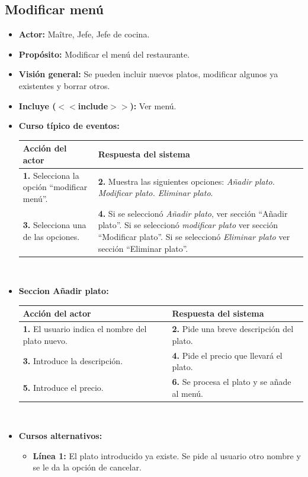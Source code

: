 \documentclass[spanish,a4paper,11pt, twoside]{report}	%
\begin{document}
		\subsection{Modificar menú}
			\begin{itemize}
			\item \textbf{Actor:} Maître, Jefe, Jefe de cocina.
			\item \textbf{Propósito:} Modificar el menú del restaurante.
			\item \textbf{Visión general:} Se pueden incluir nuevos platos, modificar algunos ya existentes y borrar otros.
			\item \textbf{Incluye ($<<$include$>>$):} Ver menú.
			\item \textbf{Curso típico de eventos:} 	\\
			\begin{tabular}{|p{6cm}||p{6cm}|}
				\hline
				\textbf{Acción del actor} & \textbf{Respuesta del sistema} \\ \hline \hline
				\textbf{1.} Selecciona la opción ``modificar menú''. & 
				\textbf{2.} Muestra las siguientes opciones: 
					\textit{Añadir plato. Modificar plato. Eliminar plato}. \\ \hline
				\textbf{3.} Selecciona una de las opciones.	& 
				\textbf{4.} Si se seleccionó \textit{Añadir plato}, ver sección ``Añadir plato''. 
					Si se seleccionó \textit{modificar plato} ver sección ``Modificar plato''. 
					Si se seleccionó \textit{Eliminar plato} ver sección ``Eliminar plato''. \\ \hline
			\end{tabular}
			\\
			
			
			\item \textbf{Seccion Añadir plato:}  \\
					\begin{tabular}{|p{6cm}||p{6cm}|}
					\hline
					\textbf{Acción del actor} & \textbf{Respuesta del sistema} \\ \hline \hline
					\textbf{1.} El usuario indica el nombre del plato nuevo. & 
					\textbf{2.} Pide una breve descripción del plato. \\ \hline
					\textbf{3.} Introduce la descripción.	& 
					\textbf{4.} Pide el precio que llevará el plato. \\ \hline
					\textbf{5.} Introduce el precio. & 
					\textbf{6.} Se procesa el plato y se añade al menú. \\ \hline
				\end{tabular}
			\\
			\item \textbf{Cursos alternativos:} 
			\begin{itemize}
				\item  \textbf{Línea 1:} El plato introducido ya existe. Se pide al usuario otro
				nombre y se le da la opción de cancelar.
			\end {itemize}
			

\end{itemize}
\end{document}
